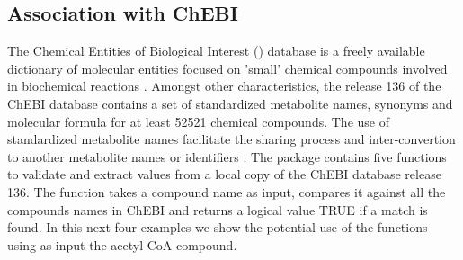 \subsection{Association with ChEBI}
The Chemical Entities of Biological Interest () database  is a freely available dictionary of molecular entities focused on 'small' chemical compounds involved in biochemical reactions \citep{Degtyarenko2007}. Amongst other characteristics, the release 136 of the ChEBI database contains a set of standardized metabolite names, synonyms and molecular formula for at least 52521 chemical compounds. The use of standardized metabolite names facilitate the sharing process and inter-convertion to another metabolite names  or identifiers \citep{Bernard2014, Ravikrishnan2015}. The  package contains five functions to validate and extract values from a local copy of the ChEBI database release 136. The  function takes a compound name as input, compares it against all the compounds names in ChEBI and returns a logical value TRUE if a match is found. In this next four examples we show the potential use of the functions using as input the acetyl-CoA compound.
